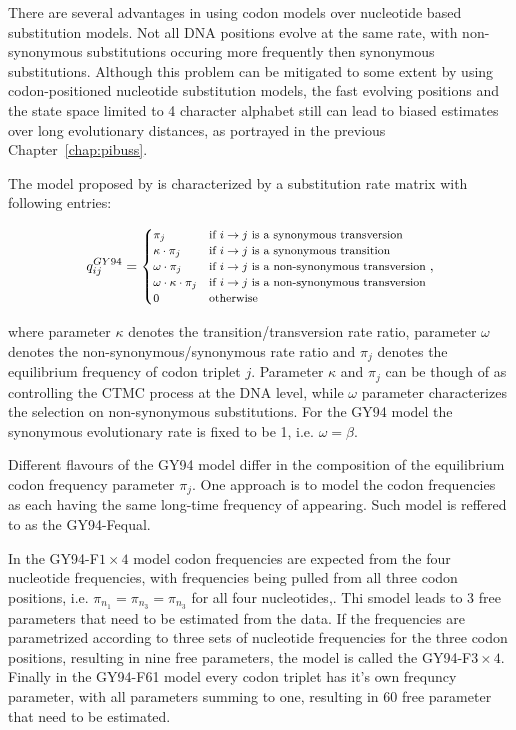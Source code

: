 There are several advantages in using codon models over nucleotide based substitution models.
Not all DNA positions evolve at the same rate, with non-synonymous substitutions occuring more frequently then synonymous substitutions.
Although this problem can be mitigated to some extent by using codon-positioned nucleotide substitution models, the fast evolving positions and the state space limited to 4 character alphabet still can lead to biased estimates over long evolutionary distances, as portrayed in the previous Chapter~\ref{chap:pibuss}.

The model proposed by \cite{Goldman1994} is characterized by a substitution rate matrix with following entries:

\begin{equation}
\footnotesize{
q_{ij}^{GY94}=\begin{cases}
\pi_{j} & \text{if \ensuremath{i\rightarrow j} is a synonymous transversion}\\
\kappa\cdot\pi_{j} & \text{if \ensuremath{i\rightarrow j} is a synonymous transition}\\
\omega\cdot\pi_{j} & \text{if \ensuremath{i\rightarrow j} is a non-synonymous transversion}\\
\omega\cdot\kappa\cdot\pi_{j} & \text{if \ensuremath{i\rightarrow j} is a non-synonymous transversion}\\
0 & \text{otherwise}
\end{cases},
} %
\label{eq:gy94}
\end{equation}

\noindent
where parameter $\kappa$ denotes the transition/transversion rate ratio, parameter $\omega$ denotes the non-synonymous/synonymous
rate ratio and $\pi_j$ denotes the equilibrium frequency of codon triplet $j$.
Parameter $\kappa$ and $\pi_j$ can be though of as controlling the CTMC process at the DNA level, while $\omega$ parameter characterizes the selection on non-synonymous substitutions.
For the GY94 model the synonymous evolutionary rate is fixed to be 1, i.e. $\omega=\beta$.

Different flavours of the GY94 model differ in the composition of the equilibrium codon frequency parameter $\pi_{j}$.
One approach is to model the codon frequencies as each having the same long-time frequency of appearing. 
Such model is reffered to as the GY94-Fequal.

In the GY94-F$1\times4$ model codon frequencies are expected from the four nucleotide frequencies, with frequencies being pulled from all three codon positions, i.e. $\pi_{n_{1}}=\pi_{n_{3}}=\pi_{n_{3}}$ for all four nucleotides,.
Thi smodel leads to 3 free parameters that need to be estimated from the data.
If the frequencies are parametrized according to three sets of nucleotide frequencies for the three codon positions, resulting in nine free parameters, the model is called the GY94-F$3\times4$.
Finally in the GY94-F61 model every codon triplet has it's own frequncy parameter, with all parameters summing to one, resulting in 60 free parameter that need to be estimated.


